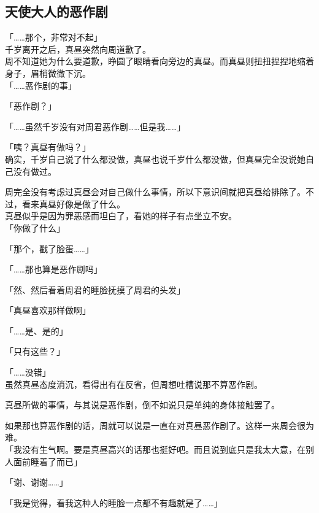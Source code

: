 \subsection{天使大人的恶作剧}

「……那个，非常对不起」\\

千岁离开之后，真昼突然向周道歉了。\\

周不知道她为什么要道歉，睁圆了眼睛看向旁边的真昼。而真昼则扭扭捏捏地缩着身子，眉梢微微下沉。\\

「……恶作剧的事」

「恶作剧？」

「……虽然千岁没有对周君恶作剧……但是我……」

「咦？真昼有做吗？」\\

确实，千岁自己说了什么都没做，真昼也说千岁什么都没做，但真昼完全没说她自己没有做过。

周完全没有考虑过真昼会对自己做什么事情，所以下意识间就把真昼给排除了。不过，看来真昼好像是做了什么。\\

真昼似乎是因为罪恶感而坦白了，看她的样子有点坐立不安。\\

「你做了什么」

「那个，戳了脸蛋……」

「……那也算是恶作剧吗」

「然、然后看着周君的睡脸抚摸了周君的头发」

「真昼喜欢那样做啊」%

「……是、是的」

「只有这些？」

「……没错」\\

虽然真昼态度消沉，看得出有在反省，但周想吐槽说那不算恶作剧。

真昼所做的事情，与其说是恶作剧，倒不如说只是单纯的身体接触罢了。

如果那也算恶作剧的话，周就可以说是一直在对真昼恶作剧了。这样一来周会很为难。\\

「我没有生气啊。要是真昼高兴的话那也挺好吧。而且说到底只是我太大意，在别人面前睡着了而已」

「谢、谢谢……」

「我是觉得，看我这种人的睡脸一点都不有趣就是了……」

